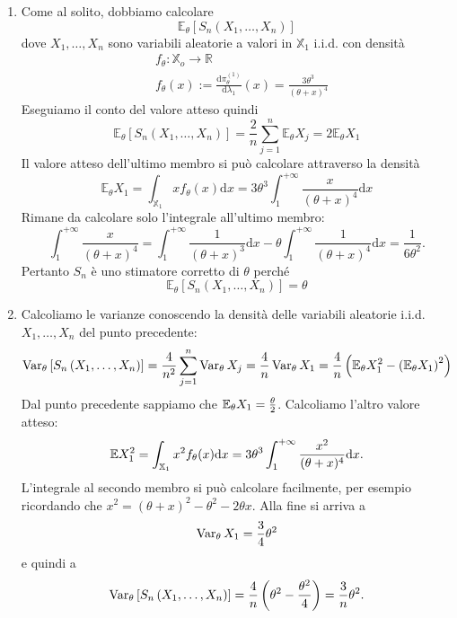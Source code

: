 \begin{soluzione}
  \begin{enumerate}
  \item Come al solito, dobbiamo calcolare
    \[
      \mathbb{E}_\theta \left[ S_n\left(X_1, \dots{}, X_n\right)
      \right]
    \]
    dove \(X_1, \dots{}, X_n\) sono variabili aleatorie a valori in
    \(\mathbb{X}_1\) i.i.d. con densità
    \begin{align*}
      & f_\theta : \mathbb{X}_o \to \mathbb{R} \\
      & f_\theta (x) := \frac{\mathrm d \pi_{\theta}^{(1)}}{\mathrm d \lambda_1}(x) = \frac{3\theta^3}{(\theta + x)^4}
    \end{align*}
    Eseguiamo il conto del valore atteso quindi
    \[
      \mathbb{E}_\theta \left[ S_n\left(X_1, \dots{}, X_n\right)
      \right] = \frac{2}{n} \sum_{j=1}^n \mathbb{E}_\theta X_j = 2
      \mathbb{E}_\theta X_1
    \]
    Il valore atteso dell'ultimo membro si può calcolare attraverso la
    densità
    \[
      \mathbb{E}_\theta X_1 = \int_{\mathbb{X}_1} x f_\theta (x)
      \mathrm d x = 3\theta^3 \int_1^{+\infty} \frac{x}{(\theta +
        x)^4} \mathrm d x
    \]
    Rimane da calcolare solo l'integrale all'ultimo membro:
    \[
      \int_1^{+\infty} \frac{x}{(\theta + x)^4} = \int_1^{+\infty}
      \frac{1}{(\theta+x)^3} \mathrm d x - \theta
      \int_1^{+\infty}\frac{1}{(\theta+x)^4} \mathrm d x =
      \frac{1}{6\theta^2} .
    \]
    Pertanto \(S_n\) è uno stimatore corretto di \(\theta\) perché
    \[
      \mathbb{E}_\theta \left[ S_n\left(X_1, \dots{}, X_n\right)
      \right] = \theta
    \]

  \item Calcoliamo le varianze conoscendo la densità delle variabili
    aleatorie i.i.d. \(X_1, \dots{}, X_n\) del punto precedente:
    \[
      \operatorname{Var}_\theta \left[ S_n\left( X_1, \dots{}, X_n \right) \right] =
      \frac{4}{n^2} \sum_{j=1}^n \operatorname{Var}_\theta X_j = \frac{4}{n}
      \operatorname{Var}_\theta X_1 = \frac{4}{n} \left( \mathbb E_\theta X_1^2 -
        \left(\mathbb E_\theta X_1 \right)^2 \right)
    \]
    Dal punto precedente sappiamo che
    \(\mathbb E_\theta X_1 = \frac{\theta}{2}\). Calcoliamo l'altro valore
    atteso:
    \[
      \mathbb E X_1^2 = \int_{\mathbb{X}_1} x^2 f_\theta (x) \mathrm d x =
      3\theta^3 \int_1^{+\infty} \frac{x^2}{(\theta+x)^4} \mathrm d x
      .
    \]
    L'integrale al secondo membro si può calcolare facilmente, per
    esempio ricordando che \(x^2 = (\theta+x)^2-\theta^2-2\theta
    x\). Alla fine si arriva a
    \[
      \operatorname{Var}_\theta X_1 = \frac{3}{4}\theta^2
    \]
    e quindi a
    \[
      \operatorname{Var}_\theta \left[ S_n\left( X_1, \dots{}, X_n \right) \right] =
      \frac{4}{n} \left( \theta^2 - \frac{\theta^2}{4} \right) =
      \frac{3}{n} \theta^2 .
    \]
    

\end{enumerate}
\end{soluzione}
